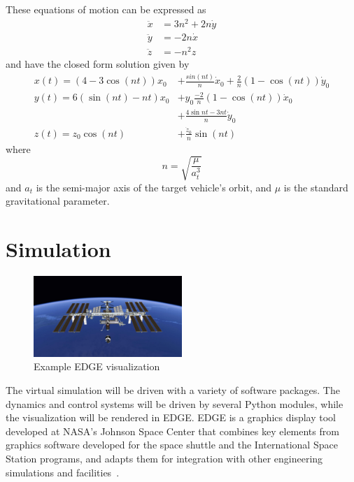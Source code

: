 \documentclass[journal, 10pt]{IEEEtran}
\begin{document}
These equations of motion can be expressed as
\begin{equation}
\begin{split}
\ddot{x} &= 3n^2 + 2n\dot y \\
\ddot{y} &= -2n\dot x \\
\ddot{z} &= -n^2z
\end{split}
\end{equation}
and have the closed form solution given by
\begin{equation}
\begin{split}
x(t) = (4-3 \cos{(nt)})x_0 &+ \frac{sin{(nt)}}{n}\dot x_0 + \frac{2}{n} (1 - \cos(nt))\dot y_0\\
y(t) = 6(\sin{(nt)}-nt)x_0 &+ y_0 \frac{-2}{n}(1 - \cos{(nt)})\dot x_0 \\
                         &+ \frac{4 \sin{nt} - 3nt}{n}\dot y_0 \\
z(t) = z_0 \cos{(nt)} &+ \frac{\dot z_0}{n} \sin{(nt)}
\end{split}
\end{equation}
where
\begin{equation}
n = \sqrt{\frac{\mu}{a^3_t}}
\end{equation}
and $a_t$ is the semi-major axis of the target vehicle's orbit, and $\mu$ is the standard gravitational parameter.

\section{Simulation}

\begin{figure}[tb]
\begin{center}
\includegraphics[width=0.5\textwidth]{figures/EDGE_ISS.jpeg}
\caption{Example EDGE visualization}
\label{edge_iss}
\end{center}
\end{figure}

The virtual simulation will be driven with a variety of software packages. The dynamics and control systems will be driven by several Python modules, while the visualization will be rendered in EDGE. EDGE is a graphics display tool developed at NASA's Johnson Space Center that combines key elements from graphics software developed for the space shuttle and the International Space Station programs, and adapts them for integration with other engineering simulations and facilities~\cite{EDGE}.
\end{document}
